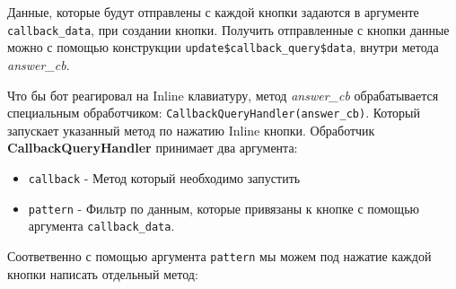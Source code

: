 \documentclass[
]{book}
\providecommand{\tightlist}{%
  \setlength{\itemsep}{0pt}\setlength{\parskip}{0pt}}
\begin{document}
Данные, которые будут отправлены с каждой кнопки задаются в аргументе \texttt{callback\_data}, при создании кнопки. Получить отправленные с кнопки данные можно с помощью конструкции \texttt{update\$callback\_query\$data}, внутри метода \emph{answer\_cb}.

Что бы бот реагировал на Inline клавиатуру, метод \emph{answer\_cb} обрабатывается специальным обработчиком: \texttt{CallbackQueryHandler(answer\_cb)}. Который запускает указанный метод по нажатию Inline кнопки. Обработчик \textbf{CallbackQueryHandler} принимает два аргумента:

\begin{itemize}
\tightlist
\item
  \texttt{callback} - Метод который необходимо запустить
\item
  \texttt{pattern} - Фильтр по данным, которые привязаны к кнопке с помощью аргумента \texttt{callback\_data}.
\end{itemize}

Соответвенно с помощью аргумента \texttt{pattern} мы можем под нажатие каждой кнопки написать отдельный метод:
\end{document}
